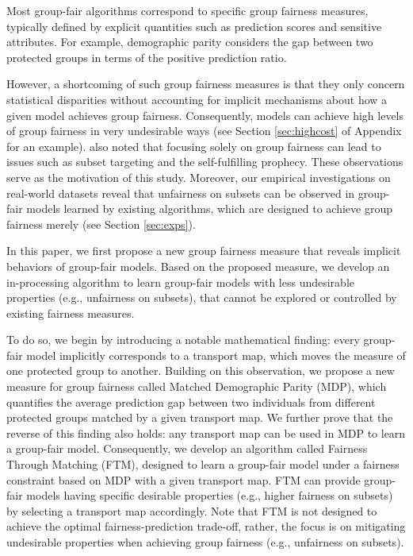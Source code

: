 \documentclass[10pt]{article} %
\begin{document}
Most group-fair algorithms correspond to specific group fairness measures, typically defined by explicit quantities such as prediction scores and sensitive attributes.
For example, demographic parity \citep{calders2009building, feldman2015certifying, angwin2016machine} considers the gap between two protected groups in terms of the positive prediction ratio.

However, a shortcoming of such group fairness measures is that they only concern statistical disparities without accounting for implicit mechanisms about how a given model achieves group fairness.
Consequently, models can achieve high levels of group fairness in very undesirable ways (see Section \ref{sec:highcost} of Appendix for an example).
\citet{10.1145/2090236.2090255} also noted that focusing solely on group fairness can lead to issues such as subset targeting and the self-fulfilling prophecy.
These observations serve as the motivation of this study.
Moreover, our empirical investigations on real-world datasets reveal that unfairness on subsets can be observed in group-fair models learned by existing algorithms, which are designed to achieve group fairness merely (see Section \ref{sec:exps}).

In this paper, we first propose a new group fairness measure that reveals implicit behaviors of group-fair models.
Based on the proposed measure, we develop an in-processing algorithm to learn group-fair models 
with less undesirable properties (e.g., unfairness on subsets), that cannot be explored or controlled by existing fairness measures.

To do so, we begin by introducing a notable {mathematical} finding: every group-fair model implicitly corresponds to a transport map, which moves the measure of one protected group to another.
Building on this observation, we propose a new measure for group fairness called Matched Demographic Parity (MDP), which quantifies the average prediction gap between two individuals from different protected groups matched by a given transport map.
We further prove that the reverse of this finding also holds: any transport map can be used in MDP to learn a group-fair model.
Consequently, we develop an algorithm called Fairness Through Matching (FTM), designed to learn a group-fair model under a fairness constraint based on MDP with a given transport map.
FTM can provide group-fair models having specific desirable properties (e.g., higher fairness on subsets) by selecting a transport map accordingly.
Note that FTM is not designed to achieve the optimal fairness-prediction trade-off, rather, the focus is on mitigating undesirable properties when achieving group fairness (e.g., unfairness on subsets).
\end{document}
